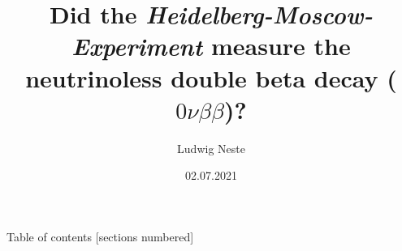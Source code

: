 

\title{Did the \emph{Heidelberg-Moscow-Experiment} measure the neutrinoless double beta decay ($0\nu\beta\beta$)?}
\date{02.07.2021}
\author{Ludwig Neste}



\begin{frame}
	\titlepage
\end{frame}
\begin{frame}{Table of contents}
	[sections numbered]
	\tableofcontents[hideallsubsections]
\end{frame}



